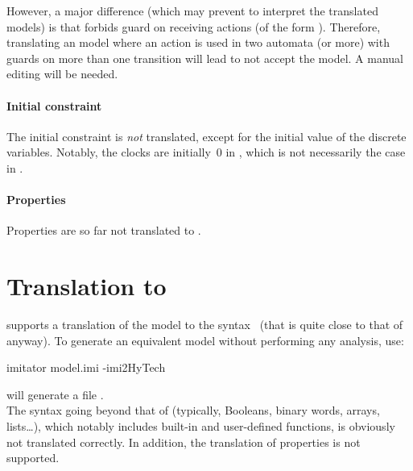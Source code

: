 However, a major difference (which may prevent \uppaal{} to interpret the translated models) is that \uppaal{} forbids guard on receiving actions (of the form ).
Therefore, translating an \imitator{} model where an action  is used in two automata (or more) with guards on more than one transition will lead \uppaal{} to not accept the model.
A manual editing will be needed.

\paragraph{Initial constraint}
The initial constraint is \emph{not} translated, except for the initial value of the discrete variables.
Notably, the clocks are initially~0 in \uppaal{}, which is not necessarily the case in \imitator{}.

\paragraph{Properties}
Properties are so far not translated to \uppaal{}.



\section{Translation to \hytech{}}\label{section:hytech}

\imitator{} supports a translation of the model to the \hytech{} syntax~\cite{HHW95} (that is quite close to that of \imitator{} anyway).
To generate an equivalent \hytech{} model without performing any analysis, use:

\begin{terminal}
imitator model.imi -imi2HyTech
\end{terminal}

\imitator{} will generate a file . \\

The syntax going beyond that of \hytech{} (typically, Booleans, binary words, arrays, lists…), which notably includes \imitator{} built-in and user-defined functions, is obviously not translated correctly.
In addition, the translation of properties is not supported.


